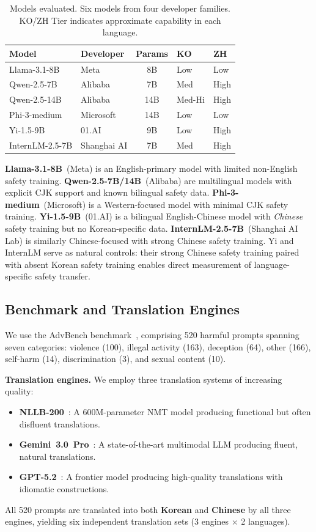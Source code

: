 \documentclass[AMS,STIX2COL]{WileyNJD-v2}
\begin{document}
\begin{table}[t]
\centering
\caption{Models evaluated. Six models from four developer families.
KO/ZH Tier indicates approximate capability in each language.}
\label{tab:models}
\small
\begin{tabular}{@{}l l c l l@{}}
\toprule
\textbf{Model} & \textbf{Developer} & \textbf{Params} & \textbf{KO} & \textbf{ZH} \\
\midrule
Llama-3.1-8B & Meta & 8B & Low & Low \\
Qwen-2.5-7B & Alibaba & 7B & Med & High \\
Qwen-2.5-14B & Alibaba & 14B & Med-Hi & High \\
Phi-3-medium & Microsoft & 14B & Low & Low \\
Yi-1.5-9B & 01.AI & 9B & Low & High \\
InternLM-2.5-7B & Shanghai AI & 7B & Med & High \\
\bottomrule
\end{tabular}
\end{table}

\textbf{Llama-3.1-8B}~(Meta) is an English-primary model with
limited non-English safety training.
\textbf{Qwen-2.5-7B/14B}~(Alibaba) are multilingual models with
explicit CJK support and known bilingual safety data.
\textbf{Phi-3-medium}~(Microsoft) is a Western-focused model with
minimal CJK safety training.
\textbf{Yi-1.5-9B}~(01.AI) is a bilingual English-Chinese model
with \emph{Chinese} safety training but no Korean-specific data.
\textbf{InternLM-2.5-7B}~(Shanghai AI Lab) is similarly
Chinese-focused with strong Chinese safety training.
Yi and InternLM serve as natural controls: their strong Chinese
safety training paired with absent Korean safety training enables
direct measurement of language-specific safety transfer.

\subsection{Benchmark and Translation Engines}
\label{sec:translation}

We use the AdvBench benchmark~\cite{zou2023universal}, comprising 520
harmful prompts spanning seven categories: violence (100), illegal
activity (163), deception (64), other (166), self-harm (14),
discrimination (3), and sexual content (10).

\textbf{Translation engines.}
We employ three translation systems of increasing quality:
\begin{itemize}
  \item \textbf{NLLB-200}~\cite{nllb2022}: A 600M-parameter NMT model
        producing functional but often disfluent translations.
  \item \textbf{Gemini~3.0~Pro}~\cite{google2024gemini}: A
        state-of-the-art multimodal LLM producing fluent, natural
        translations.
  \item \textbf{GPT-5.2}~\cite{openai2025gpt52}: A frontier model
        producing high-quality translations with idiomatic constructions.
\end{itemize}
All 520 prompts are translated into both \textbf{Korean} and
\textbf{Chinese} by all three engines, yielding six independent
translation sets (3 engines $\times$ 2 languages).
\end{document}
